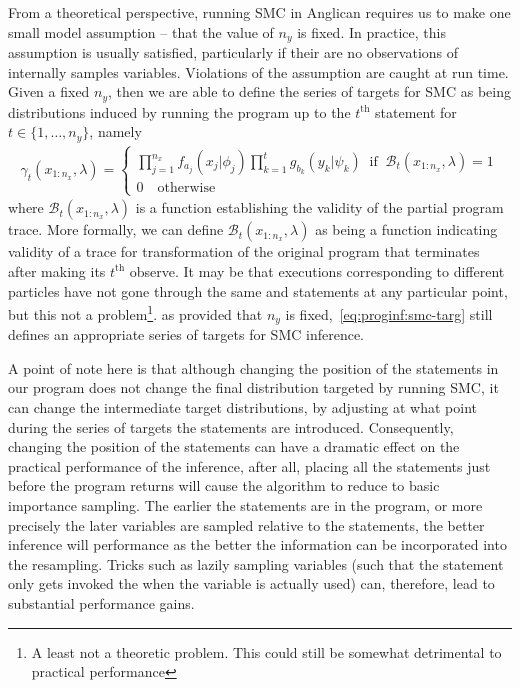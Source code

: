 From a theoretical perspective, running SMC in Anglican
requires us to make one small model assumption -- that the value of $n_y$ is fixed.  In
practice, this assumption is usually satisfied, particularly if their are no observations of
internally samples variables.  Violations of the assumption are caught at run time.  Given
a fixed $n_y$, then we are able to define the series of targets for SMC as being distributions
induced by running the program up to the $t^{\text{th}}$ \observe statement for $t\in\{1,\dots,n_y\}$,
namely
\begin{align}
\label{eq:proginf:smc-targ}
\gamma_t(x_{1:n_x}, \lambda) = \begin{cases}
\prod_{j=1}^{n_x} 
f_{a_j}(x_j | \phi_j)
\prod_{k=1}^{t}
g_{b_k}(y_k | \psi_k) \;\; \text{if} \;\; \mathcal{B}_t(x_{1:n_x},\lambda)=1 \\
0 \quad \text{otherwise}
\end{cases}
\end{align}
where $\mathcal{B}_t(x_{1:n_x},\lambda)$ is a function establishing the validity of the 
partial program trace.  More formally, we can define $\mathcal{B}_t(x_{1:n_x},\lambda)$ as
being a function indicating validity of a trace for transformation of the original program
that terminates after making its $t^{\text{th}}$ observe.
It may be that executions corresponding to different particles have not gone through the 
same \sample and \observe statements at any particular point, but this not a problem\footnote{A
	least not a theoretic problem.  This could still be somewhat detrimental to practical performance}.
as provided that $n_y$ is fixed,~\eqref{eq:proginf:smc-targ} still defines an appropriate
series of targets for SMC inference.

A point of note here is that although changing the position of the \observe statements in
our program does not change the final distribution targeted by running SMC, it can change
the intermediate target distributions, by adjusting at what point during the series of targets
the \sample statements are introduced.  Consequently, changing the position of the \observe
statements can have a dramatic effect on the practical performance of the inference, after all,
placing all the \observe statements just before the program returns will cause the algorithm
to reduce to basic importance sampling.  The earlier the \observe statements are in the program,
or more precisely the later variables are sampled relative to the \observe statements, the
better inference will performance as the better the information can be incorporated into
the resampling.  Tricks such as lazily sampling variables (such that the \sample statement
only gets invoked the when the variable is actually used) can, therefore, lead to substantial
performance gains.

